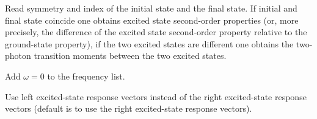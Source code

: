 \begin{description}
Read symmetry and index of the initial state and the final state.
If initial and final state coincide one obtains excited state
second-order properties (or, more precisely, the difference of the excited state second-order property relative to the ground-state property), if the two excited states are different one obtains the
two-photon transition moments between the two excited states.
 
\item[\Key{STATIC}] 
Add $\omega = 0$ to the frequency list.
 
\item[\Key{USELEF}] 
Use left excited-state response vectors instead of the right excited-state response vectors (default is to use the right excited-state
response vectors).
 
\end{description}

